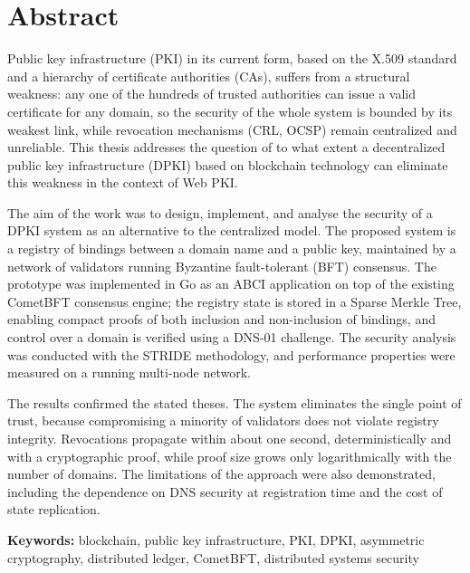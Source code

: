 \chapter*{Abstract}


Public key infrastructure (PKI) in its current form, based on the X.509 standard and a hierarchy of certificate authorities (CAs), suffers from a structural weakness: any one of the hundreds of trusted authorities can issue a valid certificate for any domain, so the security of the whole system is bounded by its weakest link, while revocation mechanisms (CRL, OCSP) remain centralized and unreliable. This thesis addresses the question of to what extent a decentralized public key infrastructure (DPKI) based on blockchain technology can eliminate this weakness in the context of Web PKI.

The aim of the work was to design, implement, and analyse the security of a DPKI system as an alternative to the centralized model. The proposed system is a registry of bindings between a domain name and a public key, maintained by a network of validators running Byzantine fault-tolerant (BFT) consensus. The prototype was implemented in Go as an ABCI application on top of the existing CometBFT consensus engine; the registry state is stored in a Sparse Merkle Tree, enabling compact proofs of both inclusion and non-inclusion of bindings, and control over a domain is verified using a DNS-01 challenge. The security analysis was conducted with the STRIDE methodology, and performance properties were measured on a running multi-node network.

The results confirmed the stated theses. The system eliminates the single point of trust, because compromising a minority of validators does not violate registry integrity. Revocations propagate within about one second, deterministically and with a cryptographic proof, while proof size grows only logarithmically with the number of domains. The limitations of the approach were also demonstrated, including the dependence on DNS security at registration time and the cost of state replication.

\vspace{1em}
\noindent\textbf{Keywords:} blockchain, public key infrastructure, PKI, DPKI, asymmetric cryptography, distributed ledger, CometBFT, distributed systems security

